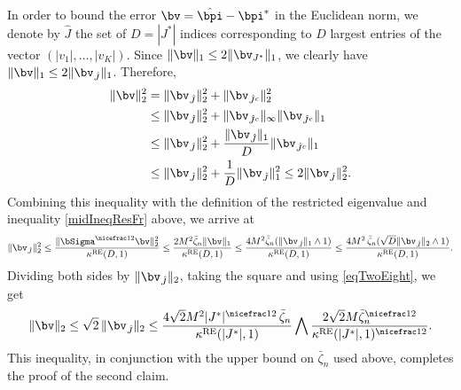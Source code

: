 In order to bound the error $\bv=\hat\bpi-\bpi^*$ in the Euclidean norm, we denote
by $\hat J $ the set of $D = |J^*|$ indices corresponding to $D$ largest entries of the
vector $(|v_1|,\ldots,|v_K|)$. Since $\|\bv\|_1\le 2\|\bv_{J^*}\|_1$, we clearly have
$\|\bv\|_1\le 2\|\bv_{\hat J}\|_1$. Therefore,
\begin{align}
\|\bv\|_2^2
		&= \|\bv_{\hat J}\|_2^2+\|\bv_{\hat J^c}\|_2^2\\
		&\le \|\bv_{\hat J}\|_2^2+\|\bv_{\hat J^c}\|_\infty\|\bv_{\hat J^c}\|_1\\
		&\le \|\bv_{\hat J}\|_2^2+\frac{\|\bv_{\hat J}\|_1}{D}\|\bv_{\hat J^c}\|_1\\
		&\le \|\bv_{\hat J}\|_2^2+\frac{1}{D}\|\bv_{\hat J}\|_1^2\le 2\|\bv_{\hat J}\|_2^2
		\label{eqTwoEight}.
\end{align}
Combining this inequality with the definition of the restricted eigenvalue and
inequality \eqref{midIneqResFr} above, we arrive at
\begin{align}
\|\bv_{\hat J}\|_2^2\le \frac{\|\bSigma^{\nicefrac12}\bv\|_2^2}{\kappa^{\rm RE}(D,1)}
		\le  \frac{2M^2\bar\zeta_n\|\bv\|_1}{\kappa^{\rm RE}(D,1)}
		\le  \frac{4M^2\bar\zeta_n(\|\bv_{\hat J}\|_1\wedge 1)}{\kappa^{\rm RE}(D,1)}
		\le  \frac{4M^2\,\bar\zeta_n(\sqrt{D}\|\bv_{\hat J}\|_2\wedge 1)}{\kappa^{\rm RE}(D,1)}.
\end{align}
Dividing both sides by $\|\bv_{\hat J}\|_2$, taking the square and using \eqref{eqTwoEight},
we get
\begin{align}
\|\bv\|_2\le \sqrt2\,\|\bv_{\hat J}\|_2
		\le  \frac{ 4 \sqrt2 M^2 |J^*|^{\nicefrac12}\,\bar\zeta_n}{\kappa^{\rm RE}(|J^*|,1)}\bigwedge
		\frac{2\sqrt2 M \bar\zeta_n^{\nicefrac12}}{\kappa^{\rm RE}(|J^*|,1)^{\nicefrac12}}.
\end{align}
This inequality, in conjunction with the upper bound on $\bar\zeta_n$ used above,
completes the proof of the second claim.




